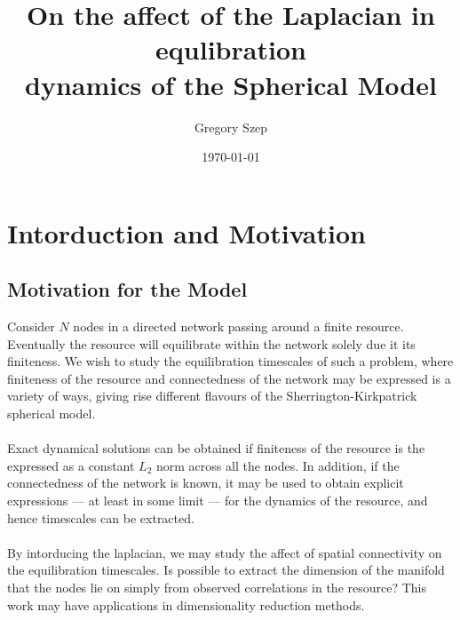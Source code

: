 \documentclass{article}[12pt]
\numberwithin{equation}{section}
\begin{document}
\title{
On the affect of the Laplacian in equlibration\\
dynamics of the Spherical Model
}

\author{Gregory Szep}
\date{\today}
\maketitle

\section{Intorduction and Motivation}
\subsection{Motivation for the Model}
Consider $N$ nodes in a directed network passing around a finite resource.
Eventually the resource will equilibrate within the network solely due it its
finiteness. We wish to study the equilibration timescales of such a problem,
where finiteness of the resource and connectedness of the network may be
expressed is a variety of ways, giving rise different flavours of the
Sherrington-Kirkpatrick spherical model.
\\\\
Exact dynamical solutions can be obtained if finiteness of the resource
is the expressed as a constant $L_2$ norm across all the nodes. In addition,
if the connectedness of the network is known, it may be used to obtain explicit
expressions --- at least in some limit --- for the dynamics of the resource,
and hence timescales can be extracted.
\\\\
By intorducing the laplacian, we may study the affect of spatial connectivity
on the equilibration timescales. Is possible to extract the dimension
of the manifold that the nodes lie on simply from observed correlations in
the resource? This work may have applications in dimensionality reduction methods.
\end{document}
